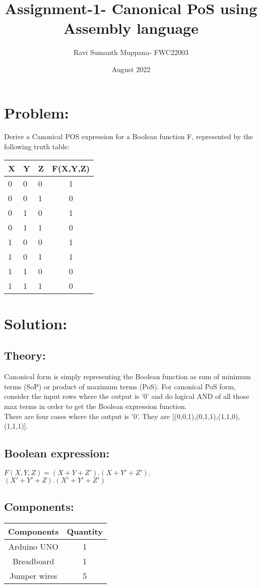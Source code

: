 \documentclass[a4paper,12pt,twocolumn]{article}
\title{Assignment-1- Canonical PoS using Assembly language}
\author{Ravi Sumanth Muppana- FWC22003}
\date{August 2022}
\begin{document}
\maketitle

\section{Problem:}
Derive a Canonical POS expression for a Boolean function F, represented by the following truth table:

\begin{tabular}{|l|l|l|c|}
	\hline
	X&Y&Z&F(X,Y,Z)\\
	\hline
	0&0&0&1\\
	0&0&1&0\\
	0&1&0&1\\
	0&1&1&0\\
	1&0&0&1\\
	1&0&1&1\\
	1&1&0&0\\
	1&1&1&0\\
	\hline
\end{tabular}

\maketitle\section{Solution:}
\subsection{Theory:}
Canonical form is simply representing the Boolean function as sum of minimum terms (SoP) or product of maximum terms (PoS). For canonical PoS form, consider the input rows where the output is '0' and do logical AND of all those max terms in order to get the Boolean expression function.\\
There are four cases where the output is '0'. They are [(0,0,1),(0,1,1),(1,1,0),(1,1,1)]. 
\subsection{Boolean expression:}
$F(X,Y,Z)=(X+Y+Z').(X+Y'+Z').$\\$(X'+Y'+Z).(X'+Y'+Z')$

\newpage
\subsection{Components:} 
\begin{tabular}{|c|c|}
	\hline
	Components&Quantity\\
	\hline
	Arduino UNO & 1\\
	Breadboard&1\\
	Jumper wires&5\\
	\hline
\end{tabular}
\end{document}
